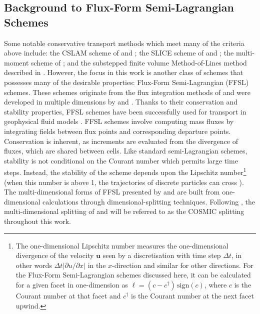 \documentclass{ametsocV6.1}
\begin{document}
\subsection{Background to Flux-Form Semi-Lagrangian Schemes}
Some notable conservative transport methods which meet many of the criteria above include: the CSLAM scheme of \citet{lauritzen2010conservative} and \citet{harris2011flux}; the SLICE scheme of \citet{zerroukat2002slice,zerroukat2004slice} and \citet{zerroukat2012three}; the multi-moment scheme of \cite{tang2022three}; and the substepped finite volume Method-of-Lines method described in \citet{melvin2024mixed}.
However, the focus in this work is another class of schemes that possesses many of the desirable properties: Flux-Form Semi-Lagrangian (FFSL) schemes.
These schemes originate from the flux integration methods of \citet{van1974towards,colella1984ppm,carpenter1990application}
and were developed in multiple dimensions by \citet{leonard1996cosmic} and \citet{lin1996ffsl}.
Thanks to their conservation and stability properties, FFSL schemes have been successfully used for transport in geophysical fluid models \citep{lin2004fvcore,putman2007fvtransport,zhou2012computational,neale2013mean,gillibrand2016mass,harris2021scientific,zhang2023history,mouallem2023implementation}.
FFSL schemes involve computing mass fluxes by integrating fields between flux points and corresponding departure points.
Conservation is inherent, as increments are evaluated from the divergence of fluxes, which are shared between cells.
Like standard semi-Lagrangian schemes, stability is not conditional on the Courant number which permits large time steps.
Instead, the stability of the scheme depends upon the Lipschitz number\footnote{The one-dimensional Lipschitz number measures the one-dimensional divergence of the velocity $\bm{u}$ seen by a discretisation with time step $\Delta t$, in other words $\Delta t|\partial u /\partial x|$ in the $x$-direction and similar for other directions. For the Flux-Form Semi-Lagrangian schemes discussed here, it can be calculated for a given facet in one-dimension as $\ell=(c-c^\dagger) \, \mathrm{sign}(c)$, where $c$ is the Courant number at that facet and $c^\dagger$ is the Courant number at the next facet upwind.} (when this number is above 1, the trajectories of discrete particles can cross \citep{smolarkiewicz1992class}).
The multi-dimensional forms of FFSL presented by \citet{leonard1996cosmic} and \citet{lin1996ffsl} are built from one-dimensional calculations through dimensional-splitting techniques.
Following \citet{leonard1996cosmic}, the multi-dimensional splitting of \citet{leonard1996cosmic} and \citet{lin1996ffsl} will be referred to as the COSMIC splitting throughout this work.
\end{document}

